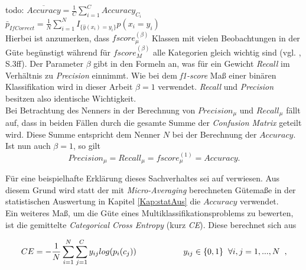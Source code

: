 \documentclass[a4paper,11pt]{article}
\begin{document}
todo: $\overline{Accuracy} = \frac{1}{C} \sum_{i = 1}^C Accuracy_{C_i}$\\
$\bar{p}_{IfCorrect} = \frac{1}{N}\sum_{i=1}^N  I_{\{\hat{y}(x_i) = y_i\}} p(x_i = y_i)$\\


Hierbei ist anzumerken, dass $fscore_{\mu}^{(\beta)}$ Klassen mit vielen Beobachtungen in der Güte begünstigt während für $fscore_M^{(\beta)}$ alle Kategorien gleich wichtig sind  (vgl. \cite{sokolova}, S.3ff). Der Parameter $\beta$ gibt in den Formeln an, was für ein Gewicht \textit{Recall} im Verhältnis zu \textit{Precision} einnimmt.
Wie bei dem \textit{f1-score} Maß einer binären Klassifikation wird in dieser Arbeit $\beta = 1$ verwendet. \textit{Recall} und \textit{Precision} besitzen also identische Wichtigkeit. \\
Bei Betrachtung des Nenners in der Berechnung von $Precision_{\mu}$ und $Recall_{\mu}$ fällt auf, dass in beiden Fällen durch die gesamte Summe der \textit{Confusion Matrix} geteilt wird. Diese Summe entspricht dem Nenner $N$ bei der Berechnung der $Accuracy$. Ist nun auch $\beta = 1$, so gilt 
\[Precision_{\mu} =  Recall_{\mu} =  fscore_{\mu}^{(1)} = Accuracy.\]

Für eine beispielhafte Erklärung dieses Sachverhaltes sei auf \cite{towards1}
verwiesen. Aus diesem Grund wird statt der mit \textit{Micro-Averaging} berechneten Gütemaße in der statistischen Auswertung in Kapitel \ref{Kap:statAus} die $Accuracy$ verwendet.\\

Ein weiteres Maß, um die Güte eines Multiklassifikationsproblems zu bewerten, ist die gemittelte \textit{Categorical Cross Entropy} (kurz \textit{CE}). Diese berechnet sich aus

\[ CE = - \frac{1}{N}\sum_{i=1}^N \sum_{j = 1}^C y_{ij} log(p_i(c_j)) \hspace{2cm} y_{ij} \in \{0,1\} \hspace{0.2cm} \forall i, j = 1,...,N \hspace{0.2cm} ,\]
\end{document}
